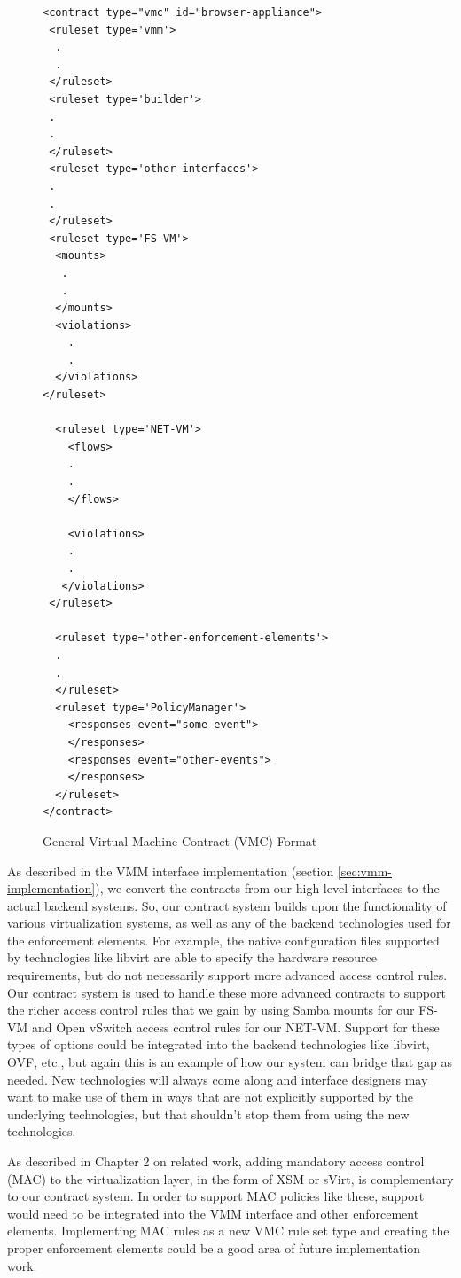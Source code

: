 \begin{figure}[tbp]
\caption{General Virtual Machine Contract (VMC) Format}
\label{lst:vmc_general}

\begin{lstlisting}
<contract type="vmc" id="browser-appliance">
 <ruleset type='vmm'>
  .
  .
 </ruleset>
 <ruleset type='builder'>
 .
 .
 </ruleset>
 <ruleset type='other-interfaces'>
 .
 .
 </ruleset>
 <ruleset type='FS-VM'>
  <mounts>
   .
   .
  </mounts>
  <violations>
    .
    .
  </violations>
</ruleset>

  <ruleset type='NET-VM'>
    <flows>
    .
    .
    </flows>

    <violations>
    .
    . 
   </violations>
 </ruleset>

  <ruleset type='other-enforcement-elements'>
  .
  .
  </ruleset>
  <ruleset type='PolicyManager'>
    <responses event="some-event">
    </responses>
    <responses event="other-events">
    </responses>
  </ruleset>
</contract>
\end{lstlisting}
\end{figure}

As described in the VMM interface implementation (section \ref{sec:vmm-implementation}), we convert the contracts from our high level interfaces to the actual backend systems. So, our contract system builds upon the functionality of various virtualization systems, as well as any of the backend technologies used for the enforcement elements. For example, the native configuration files supported by technologies like libvirt are able to specify the hardware resource requirements, but do not necessarily support more advanced access control rules. Our contract system is used to handle these more advanced contracts to support the richer access control rules that we gain by using Samba mounts for our FS-VM and Open vSwitch access control rules for our NET-VM. Support for these types of options could be integrated into the backend technologies like libvirt, OVF, etc., but again this is an example of how our system can bridge that gap as needed. New technologies will always come along and interface designers may want to make use of them in ways that are not explicitly supported by the underlying technologies, but that shouldn't stop them from using the new technologies.

As described in Chapter 2 on related work, adding mandatory access control (MAC) to the virtualization layer, in the form of XSM\cite{xsm_xen_summit_3rd} or sVirt\cite{sVirt_website}, is complementary to our contract system. In order to support MAC policies like these, support would need to be integrated into the VMM interface and other enforcement elements. Implementing MAC rules as a new VMC rule set type and creating the proper enforcement elements could be a good area of future implementation work.

